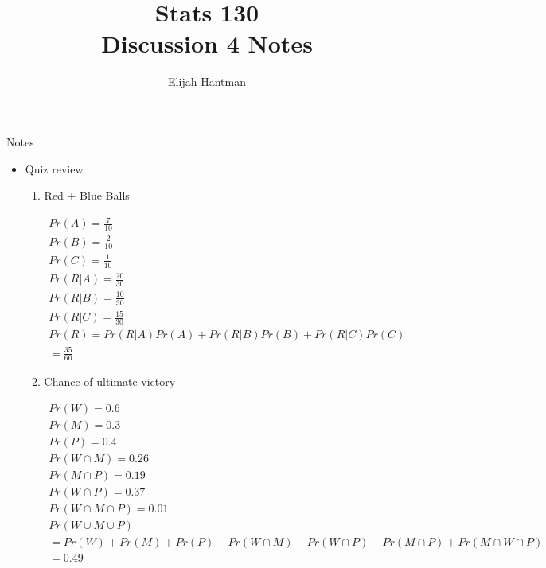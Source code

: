 \documentclass{report}
\title{\Huge{Stats 130}\\Discussion 4 Notes}
\author{\huge{Elijah Hantman}}
\date{}
\begin{document}
\maketitle
\newpage

{\large Notes}
\begin{itemize}
    \item Quiz review
        \begin{enumerate}
            \item Red + Blue Balls
                
                \vspace{10}

                \begin{gather}
                    Pr(A) = \frac{7}{10}\\
                    Pr(B) = \frac{2}{10}\\
                    Pr(C) = \frac{1}{10}\\
                    Pr(R | A) = \frac{20}{30}\\
                    Pr(R | B) = \frac{10}{30}\\
                    Pr(R | C) = \frac{15}{30}\\
                    Pr(R) = Pr(R|A)Pr(A) + Pr(R|B)Pr(B) + Pr(R|C)Pr(C)\\
                    = \frac{35}{60}
                \end{gather}
            \item Chance of ultimate victory

                \begin{gather}
                   Pr(W) = 0.6\\ 
                   Pr(M) = 0.3\\
                   Pr(P) = 0.4\\
                   Pr(W \cap M) = 0.26\\
                   Pr(M \cap P) = 0.19\\
                   Pr(W \cap P) = 0.37\\
                   Pr(W \cap M \cap P) = 0.01\\
                   Pr(W \cup M \cup P)\\
                   = Pr(W) + Pr(M) + Pr(P) - Pr(W \cap M)
                   - Pr(W \cap P) - Pr(M \cap P) + Pr(M \cap W \cap P)\\
                   = 0.49
                \end{gather}


\end{enumerate}
\end{itemize}
\end{document}

